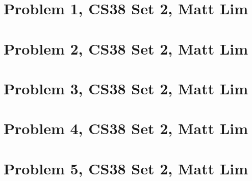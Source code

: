 \documentclass{article}
\begin{document}
\section*{Problem 1, CS38 Set 2, Matt Lim}
\newpage

\section*{Problem 2, CS38 Set 2, Matt Lim}
\newpage

\section*{Problem 3, CS38 Set 2, Matt Lim}
\newpage

\section*{Problem 4, CS38 Set 2, Matt Lim}
\newpage

\section*{Problem 5, CS38 Set 2, Matt Lim}
\newpage
\end{document}
